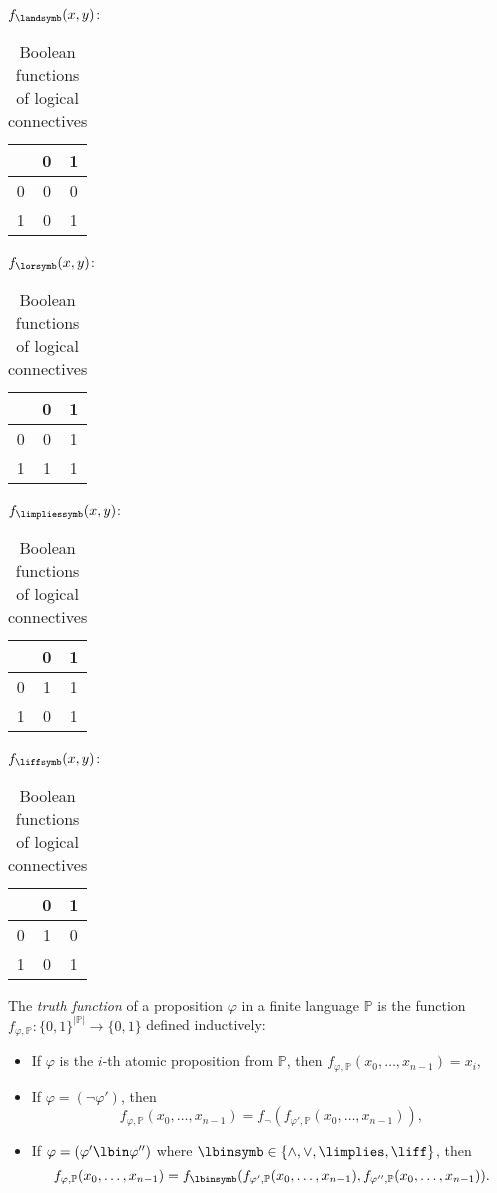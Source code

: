 \begin{table}
\centering
$f_\landsymb(x,y)$:  
\begin{tabular}{c|cc}
      & 0 & 1  \\ \hline
    0 & 0 & 0  \\
    1 & 0 & 1 
\end{tabular}\quad
$f_\lorsymb(x,y)$:         
\begin{tabular}{c|cc}
      & 0 & 1  \\ \hline
    0 & 0 & 1  \\
    1 & 1 & 1 
\end{tabular}\quad
$f_\limpliessymb(x,y)$:         
\begin{tabular}{c|cc}
      & 0 & 1  \\ \hline
    0 & 1 & 1  \\
    1 & 0 & 1 
\end{tabular}\quad
$f_\liffsymb(x,y)$:         
\begin{tabular}{c|cc}
      & 0 & 1  \\ \hline
    0 & 1 & 0  \\
    1 & 0 & 1 
\end{tabular}
\caption{Boolean functions of logical connectives}
\label{table:boolean-functions-for-logical-connectives}    
\end{table}

\begin{definition}\label{definition:truth-function}
The \emph{truth function} of a proposition $\varphi$ in a finite language $\mathbb P$ is the function $f_{\varphi,\mathbb P}\colon\{0,1\}^{|\mathbb P|}\to\{0,1\}$ defined inductively:
\begin{itemize}
    \item If $\varphi$ is the $i$-th atomic proposition from $\mathbb P$, then $f_{\varphi,\mathbb P}(x_0,\dots,x_{n-1})=x_i$,
    \item If $\varphi = (\neg \varphi')$, then 
    $$
    f_{\varphi,\mathbb P}(x_0,\dots,x_{n-1}) = f_\neg(f_{\varphi',\mathbb P}(x_0,\dots,x_{n-1})),
    $$
    \item If $\varphi = (\varphi' \lbin \varphi'')$ where $\lbinsymb \in \{\land, \lor, \limplies, \liff\}$, then 
    $$
    f_{\varphi,\mathbb P}(x_0,\dots,x_{n-1}) = f_\lbinsymb(f_{\varphi',\mathbb P}(x_0,\dots,x_{n-1}), f_{\varphi'',\mathbb P}(x_0,\dots,x_{n-1})).
    $$
\end{itemize}
\end{definition}

